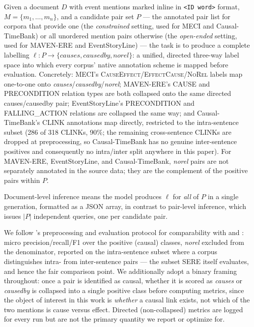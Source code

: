 \documentclass[11pt]{article}
\begin{document}
Given a document $D$ with event mentions marked inline in \texttt{<ID word>}
format, $M = \{m_1, \dots, m_n\}$, and a candidate pair set $P$ --- the annotated
pair list for corpora that provide one (the \emph{constrained} setting, used for
MECI and Causal-TimeBank) or all unordered mention pairs otherwise (the
\emph{open-ended} setting, used for MAVEN-ERE and EventStoryLine) --- the task is to
produce a complete labelling $\ell: P \to \{\textit{causes}, \textit{causedby},
\textit{norel}\}$: a unified, directed three-way label space into which every
corpus' native annotation scheme is mapped before evaluation. Concretely: MECI's
\textsc{CauseEffect}/\textsc{EffectCause}/\textsc{NoRel} labels map one-to-one onto
\textit{causes}/\textit{causedby}/\textit{norel}; MAVEN-ERE's \textsc{CAUSE} and
\textsc{PRECONDITION} relation types are both collapsed onto the same directed
causes/causedby pair; EventStoryLine's \textsc{PRECONDITION} and
\textsc{FALLING\_ACTION} relations are collapsed the same way; and Causal-TimeBank's
CLINK annotations map directly, restricted to the intra-sentence subset (286 of 318
CLINKs, 90\%; the remaining cross-sentence CLINKs are dropped at preprocessing, so
Causal-TimeBank has no genuine inter-sentence positives and consequently no
intra/inter split anywhere in this paper). For MAVEN-ERE, EventStoryLine, and
Causal-TimeBank, \textit{norel} pairs are not separately annotated in the source
data; they are the complement of the positive pairs within $P$.

Document-level inference means the model produces $\ell$ for \emph{all} of $P$ in a
single generation, formatted as a JSON array, in contrast to pair-level inference,
which issues $|P|$ independent queries, one per candidate pair.

We follow \citet{gao2023chatgpt}'s preprocessing and evaluation protocol for
comparability with \citet{hao2026sere} and \citet{cai2025dreci}: micro
precision/recall/F1 over the positive (causal) classes, \textit{norel} excluded from
the denominator, reported on the intra-sentence subset where a corpus distinguishes
intra- from inter-sentence pairs --- the subset SERE itself evaluates, and hence the
fair comparison point. We additionally adopt a binary framing throughout: once a
pair is identified as causal, whether it is scored as \textit{causes} or
\textit{causedby} is collapsed into a single positive class before computing
metrics, since the object of interest in this work is \emph{whether} a causal link
exists, not which of the two mentions is cause versus effect. Directed
(non-collapsed) metrics are logged for every run but are not the primary quantity we
report or optimize for.
\end{document}
